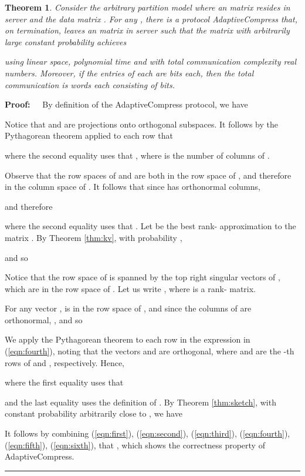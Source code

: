 \documentclass[11pt]{article}
\newtheorem{theorem}{Theorem}
\newenvironment{proof}{\begin{trivlist} \item {\bf Proof:~~}}
  {\qed\end{trivlist}}
\def\qed{\hfill\rule{2mm}{2mm}}
\begin{document}
\begin{theorem}\label{thm:low-rank-arbitrary}
Consider the arbitrary partition model where an  matrix  resides in server  and the data matrix
.
For any , there is a protocol {\sc AdaptiveCompress} that, on termination, leaves an
 matrix  in server  such that the matrix  
with arbitrarily large constant probability achieves

using linear space, polynomial time and with total communication complexity  real numbers.
Moreover, if the entries of each 
are  bits each, then the total communication is  words each consisting of  bits.
\end{theorem}
\begin{proof}
By definition of the {\sc AdaptiveCompress} protocol, we have 


Notice
that  and  are projections onto orthogonal subspaces. 
It follows by the Pythagorean theorem applied to each row that

where the second equality uses that , where  is the number of columns of .

Observe that the row spaces of  and  are both in the row space of , and
therefore in the column space of . It follows that since  has orthonormal columns,
 
and therefore

where the second equality uses that . Let  be the best rank- approximation to
the matrix . By Theorem \ref{thm:kv}, with probability ,

and so

Notice that the row space of  is spanned by the top  right singular
vectors of , which are in the row space of . Let us write , 
where  is a rank- matrix.

For any vector ,  is in the row space of , and since the columns of  are orthonormal, 
,
and so 

We apply the Pythagorean theorem to each row in the expression in (\ref{eqn:fourth}), noting that
the vectors  and  are orthogonal, where  and  are the -th rows of  and ,
respectively. Hence,

where the first equality uses that

and 
the last equality uses the definition of . By Theorem \ref{thm:sketch},
with constant probability arbitrarily close to , we have

It follows by combining (\ref{eqn:first}), (\ref{eqn:second}), (\ref{eqn:third}), (\ref{eqn:fourth}), (\ref{eqn:fifth}),
(\ref{eqn:sixth}),
that , 
which shows the correctness property of {\sc AdaptiveCompress}.


\end{proof}
\end{document}
